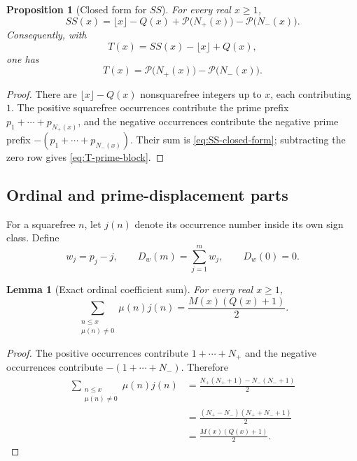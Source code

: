 \documentclass[11pt]{amsart}
\numberwithin{equation}{section}
\theoremstyle{plain}
\newtheorem{proposition}[theorem]{Proposition}
\newtheorem{lemma}[theorem]{Lemma}
\theoremstyle{definition}
\theoremstyle{remark}
\newcommand{\calP}{\mathcal P}
\begin{document}
\begin{proposition}[Closed form for $SS$]
\label{prop:SS-closed-form}
For every real $x\ge1$,
\begin{equation}
SS(x)=\lfloor x\rfloor-Q(x)
+\calP\bigl(N_+(x)\bigr)-\calP\bigl(N_-(x)\bigr).
\label{eq:SS-closed-form}
\end{equation}
Consequently, with
\begin{equation}
T(x)=SS(x)-\lfloor x\rfloor+Q(x),
\label{eq:T-definition}
\end{equation}
one has
\begin{equation}
T(x)=\calP\bigl(N_+(x)\bigr)-\calP\bigl(N_-(x)\bigr).
\label{eq:T-prime-block}
\end{equation}
\end{proposition}

\begin{proof}
There are $\lfloor x\rfloor-Q(x)$ nonsquarefree integers up to $x$, each
contributing $1$.  The positive squarefree occurrences contribute the prime
prefix $p_1+\cdots+p_{N_+(x)}$, and the negative occurrences contribute the
negative prime prefix $-(p_1+\cdots+p_{N_-(x)})$.  Their sum is
\eqref{eq:SS-closed-form}; subtracting the zero row gives
\eqref{eq:T-prime-block}.
\end{proof}

\subsection{Ordinal and prime-displacement parts}
\label{subsec:ordinal-displacement}

For a squarefree $n$, let $j(n)$ denote its occurrence number inside its own
sign class.  Define
\begin{equation}
w_j=p_j-j,\qquad
D_w(m)=\sum_{j=1}^{m}w_j,\qquad D_w(0)=0.
\label{eq:w-Dw-definition}
\end{equation}

\begin{lemma}[Exact ordinal coefficient sum]
\label{lem:ordinal-coefficient-sum}
For every real $x\ge1$,
\begin{equation}
\sum_{\substack{n\le x\\ \mu(n)\ne0}}
\mu(n)j(n)=\frac{M(x)(Q(x)+1)}2.
\label{eq:ordinal-coefficient-sum}
\end{equation}
\end{lemma}

\begin{proof}
The positive occurrences contribute $1+\cdots+N_+$ and the negative
occurrences contribute $-(1+\cdots+N_-)$.  Therefore
\begin{align}
\sum_{\substack{n\le x\\ \mu(n)\ne0}}\mu(n)j(n)
&=\frac{N_+(N_++1)-N_-(N_-+1)}2
\label{eq:ordinal-sum-first}\\
&=\frac{(N_+-N_-)(N_++N_-+1)}2
\label{eq:ordinal-sum-second}\\
&=\frac{M(x)(Q(x)+1)}2.
\label{eq:ordinal-sum-third}
\end{align}
\end{proof}
\end{document}
